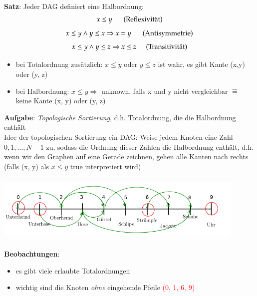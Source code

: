 \documentclass[11pt, fleqn]{scrreprt}
\begin{document}
    \textbf{Satz}: Jeder DAG definiert eine Halbordnung:
    \[ x \leq y \hspace*{5mm}\text{ (Reflexivität)}\]
    \[ x \leq y \land y \leq x \Rightarrow x = y\hspace*{5mm} \text{ (Antisymmetrie)}\]
    \[ x \leq y \land y \leq z \Rightarrow x \leq z \hspace*{5mm} \text{(Transitivität)}\]

    \begin{itemize}[label={}]
        \item bei Totalordnung zusätzlich: $x\leq y$ oder $y \leq z$ ist wahr, es gibt Kante (x,y) oder (y, z)
        \item   bei Halbordnung: $x \leq y \Rightarrow$ \glqq unknown\grqq , falls x und y nicht vergleichbar $\widehat{=}$ keine Kante (x, y) oder (y, z)
    \end{itemize}



    \textbf{Aufgabe}: \emph{Topologische Sortierung}, d.h. Totalordnung, die die Halbordnung enthält\\

    Idee der topologischen Sortierung ein DAG: Weise jedem Knoten eine Zahl $0, 1, \dots, N-1$ zu, sodass die Ordnung dieser Zahlen die Halbordnung enthält, d.h. wenn wir den Graphen auf eine Gerade zeichnen, gehen alle Kanten nach rechts (falls (x, y) als $x \leq y$ true interpretiert wird)\\

    \includegraphics[width=12cm,height=4cm,keepaspectratio]{./Pictures/Zeitstrahl.png}\\

    \textbf{Beobachtungen}:
    \begin{itemize}
        \item es gibt viele erlaubte Totalordnungen
        \item wichtig sind die Knoten \emph{ohne} eingehende Pfeile \textcolor{red}{(0, 1, 6, 9)}
    \end{itemize}
\end{document}
